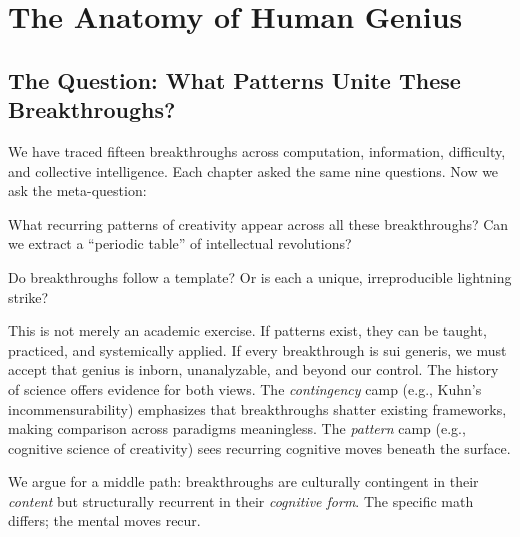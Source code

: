 
\chapter{The Anatomy of Human Genius}
\label{ch:anatomy}

\section{The Question: What Patterns Unite These Breakthroughs?}
\label{sec:anatomy:question}

We have traced fifteen breakthroughs across computation, information, difficulty, and collective intelligence. Each chapter asked the same nine questions. Now we ask the meta-question:

\begin{question}What recurring patterns of creativity appear across all these breakthroughs? Can we extract a ``periodic table'' of intellectual revolutions?\end{question}

\begin{highlightbox}
Do breakthroughs follow a template? Or is each a unique, irreproducible lightning strike?

\end{highlightbox}

This is not merely an academic exercise. If patterns exist, they can be taught, practiced, and systemically applied. If every breakthrough is sui generis, we must accept that genius is inborn, unanalyzable, and beyond our control. The history of science offers evidence for both views. The \emph{contingency} camp (e.g., Kuhn's incommensurability) emphasizes that breakthroughs shatter existing frameworks, making comparison across paradigms meaningless. The \emph{pattern} camp (e.g., cognitive science of creativity) sees recurring cognitive moves beneath the surface.

We argue for a middle path: breakthroughs are culturally contingent in their \emph{content} but structurally recurrent in their \emph{cognitive form}. The specific math differs; the mental moves recur.

